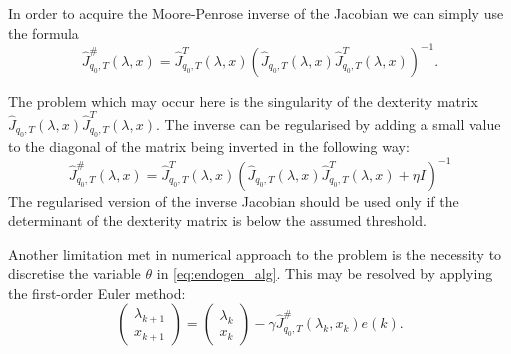 In order to acquire the Moore-Penrose inverse of the Jacobian we can simply use the formula
\begin{equation}
\hat J^\#_{q_0, T}(\lambda, x)=\hat J^T_{q_0, T}(\lambda, x)\left(\hat J_{q_0, T}(\lambda, x)\hat J^T_{q_0, T}(\lambda, x)\right)^{-1}.
\end{equation}

The problem which may occur here is the singularity of the dexterity matrix\\
$\hat J_{q_0, T}(\lambda, x)\hat J^T_{q_0, T}(\lambda, x)$. The inverse can be regularised by adding a small value to the diagonal of the matrix being inverted in the following way:
\begin{equation}
\hat J^\#_{q_0, T}(\lambda, x)=\hat J^T_{q_0, T}(\lambda, x)\left(\hat J_{q_0, T}(\lambda, x)\hat J^T_{q_0, T}(\lambda, x)+\eta I\right)^{-1}
\end{equation}
The regularised version of the inverse Jacobian should be used only if the determinant of the dexterity matrix is below the assumed threshold.

Another limitation met in numerical approach to the problem is the necessity to discretise the variable $\theta$ in \eqref{eq:endogen_alg}.
This may be resolved by applying the first-order Euler method:
\begin{equation}
\begin{pmatrix}
\lambda_{k+1}\\
x_{k+1}
\end{pmatrix}  =\begin{pmatrix}\lambda_{k}\\
x_{k}
\end{pmatrix} - \gamma \hat J^\#_{q_0, T}(\lambda_k, x_k)e(k).
\end{equation}